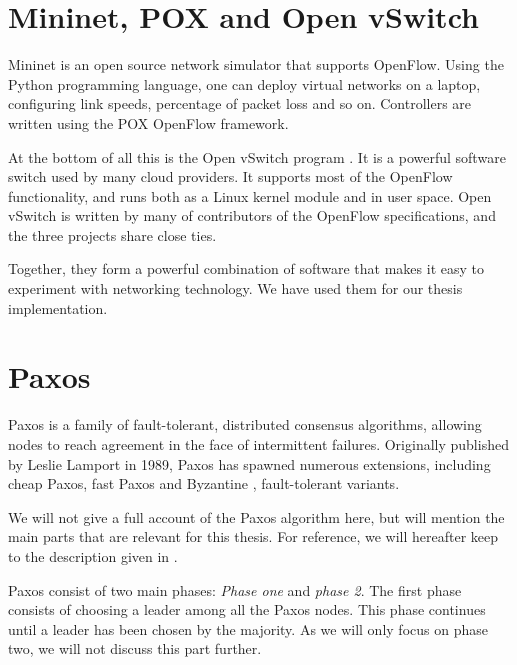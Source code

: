 \section{Mininet, POX and Open vSwitch}
\label{chapter:mininet}

Mininet \cite{github:mininet} is an open source network simulator that
supports OpenFlow.
%
Using the Python programming language, one can deploy virtual networks on a
laptop, configuring link speeds, percentage of packet loss and so on.
%
Controllers are written using the POX \cite{github:pox} OpenFlow framework.

At the bottom of all this is the Open vSwitch program \cite{github:ovs}.
It is a powerful software switch used by many cloud providers.
It supports most of the OpenFlow functionality, and runs both as a Linux
kernel module and in user space.
%
Open vSwitch is written by many of contributors of the OpenFlow
specifications, and the three projects share close ties.

Together, they form a powerful combination of software that makes it easy
to experiment with networking technology.  We have used them for our thesis
implementation.

\section{Paxos}
\label{chapter:background.paxos}

Paxos \cite{Lam01, Lamport:1998:PP:279227.279229} is a family of
fault-tolerant, distributed consensus algorithms, allowing nodes to reach
agreement in the face of intermittent failures.
%
Originally published by Leslie Lamport in 1989, Paxos
has spawned numerous extensions, including cheap Paxos,
 fast Paxos
 and Byzantine
, fault-tolerant variants.

We will not give a full account of the Paxos algorithm here, but will
mention the main parts that are relevant for this thesis.  For reference, we
will hereafter keep to the description given in \cite{Lam01}.

Paxos consist of two main phases: \textit{Phase one} and \textit{phase 2}.
The first phase consists of choosing a leader among all the Paxos nodes.
This phase continues until a leader has been chosen by the majority.
As we will only focus on phase two, we will not discuss this part further.

